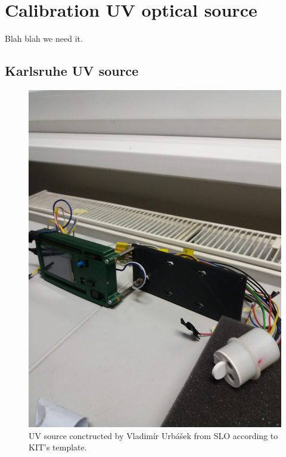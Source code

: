 
\chapter{Calibration UV optical source}
Blah blah we need it.
\section{Karlsruhe UV source}


 \begin{figure}[H]
 \centering
 \includegraphics[scale=0.09, angle = 270, origin = c]{./pictures/KarlsRuhe}
 \caption{UV source conctructed by Vladimír Urbášek from SLO according to KIT's template.}
 \label{UVsource}
\end{figure}


